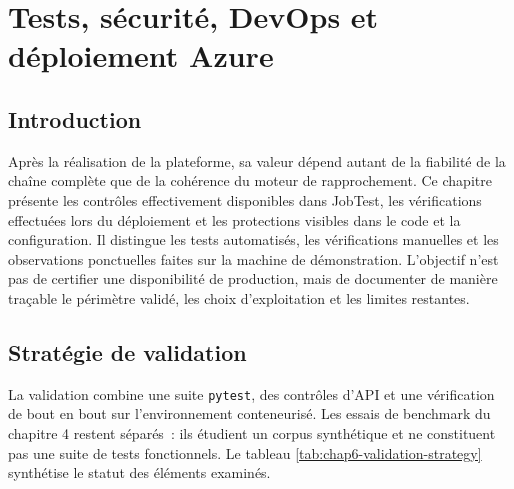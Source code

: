 \chapter{Tests, sécurité, DevOps et déploiement Azure}
\label{chap:tests-securite}

\section*{Introduction}

Après la réalisation de la plateforme, sa valeur dépend autant de la fiabilité de la chaîne complète que de la cohérence du moteur de rapprochement. Ce chapitre présente les contrôles effectivement disponibles dans JobTest, les vérifications effectuées lors du déploiement et les protections visibles dans le code et la configuration. Il distingue les tests automatisés, les vérifications manuelles et les observations ponctuelles faites sur la machine de démonstration. L'objectif n'est pas de certifier une disponibilité de production, mais de documenter de manière traçable le périmètre validé, les choix d'exploitation et les limites restantes.

\section{Stratégie de validation}

La validation combine une suite \texttt{pytest}, des contrôles d'API et une vérification de bout en bout sur l'environnement conteneurisé. Les essais de benchmark du chapitre 4 restent séparés~: ils étudient un corpus synthétique et ne constituent pas une suite de tests fonctionnels. Le tableau \ref{tab:chap6-validation-strategy} synthétise le statut des éléments examinés.


